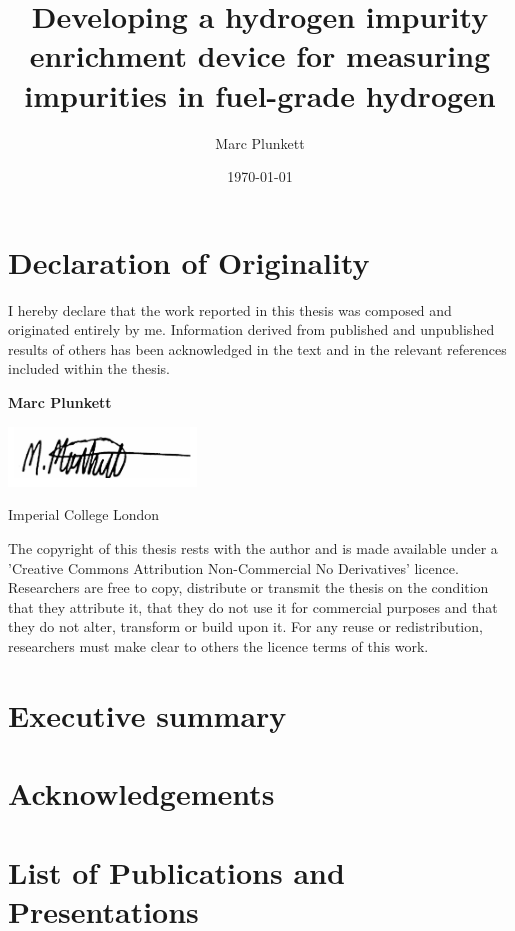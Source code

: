 \documentclass[a4paper,12pt]{report}
\begin{document}
\title{Developing a hydrogen impurity enrichment device for measuring impurities in fuel-grade hydrogen}
\author{Marc Plunkett}
\date{\today}
\maketitle

\chapter*{Declaration of Originality}
I hereby declare that the work reported in this thesis was composed and originated entirely by me. Information derived from published and unpublished results of others has been acknowledged in the text and in the relevant references included within the thesis.

\noindent\newline
\textbf{Marc Plunkett}\newline

\includegraphics[width=50mm,scale=0.5]{figures/sig.png}\newline

\noindent
Imperial College London\newline

The copyright of this thesis rests with the author and is made available under a 'Creative Commons Attribution Non-Commercial No Derivatives' licence. Researchers are free to copy, distribute or transmit the thesis on the condition that they attribute it, that they do not use it for commercial purposes and that they do not alter, transform or build upon it. For any reuse or redistribution, researchers must make clear to others the licence terms of this work.


\chapter*{Executive summary}

\chapter*{Acknowledgements}

\chapter*{List of Publications and Presentations}
\end{document}
